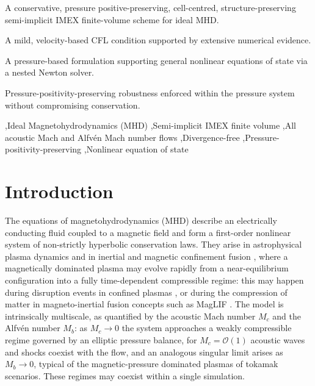 \documentclass[a4paper,fleqn]{cas-sc}
\theoremstyle{definition}
\theoremstyle{remark}
\begin{document}

\begin{highlights}
\item A conservative, pressure positive-preserving, cell-centred, structure-preserving semi-implicit IMEX finite-volume scheme for ideal MHD.
\item A mild, velocity-based CFL condition supported by extensive numerical evidence.
\item A pressure-based formulation supporting general nonlinear equations of state via a nested Newton solver.
\item Pressure-positivity-preserving robustness enforced within the pressure system without compromising conservation.
\end{highlights}


\begin{keywords}
\sep Ideal Magnetohydrodynamics (MHD)
\sep Semi-implicit IMEX finite volume
\sep All acoustic Mach and Alfvén Mach number flows
\sep Divergence-free
\sep Pressure-positivity-preserving
\sep Nonlinear equation of state
\end{keywords}

\maketitle

\section{Introduction}

The equations of magnetohydrodynamics (MHD) describe an electrically conducting fluid
coupled to a magnetic field and form a first-order nonlinear system of non-strictly
hyperbolic conservation laws. They arise in astrophysical plasma dynamics
\cite{GoedbloedPoedts2019,Priest2014} and in inertial and magnetic confinement fusion
\cite{Jardin2010,AtzeniMeyer2004}, where a magnetically dominated plasma may evolve
rapidly from a near-equilibrium configuration into a fully time-dependent compressible
regime: this may happen during disruption events in confined plasmas \cite{disruption}, or during the
compression of matter in magneto-inertial fusion concepts such as MagLIF
\cite{Slutz2010,Gomez2014,Sinars2020}. The model is intrinsically multiscale, as
quantified by the acoustic Mach number $M_c$ and the Alfv\'en number $M_b$: as $M_c
\to 0$ the system approaches a weakly compressible regime governed by an elliptic
pressure balance, for $M_c = \mathcal{O}(1)$ acoustic waves and shocks coexist with
the flow, and an analogous singular limit arises as $M_b \to 0$, typical of the
magnetic-pressure dominated plasmas of tokamak scenarios. These regimes may coexist
within a single simulation.
\end{document}
